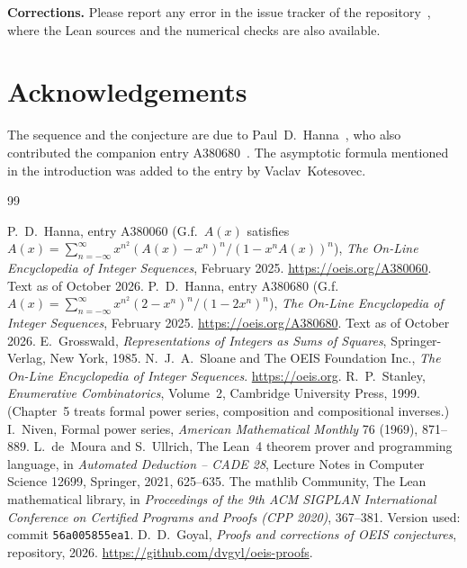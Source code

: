 \documentclass[11pt,a4paper]{article}
\theoremstyle{definition}
\theoremstyle{remark}
\newcommand{\para}[1]{\par\medskip\noindent\textbf{#1}\enspace}
\begin{document}
\para{Corrections.} Please report any error in the issue tracker of the repository~\cite{repo}, where the Lean sources and the numerical checks are also
available.

\section*{Acknowledgements}
The sequence and the conjecture are due to Paul~D.~Hanna~\cite{oeis}, who also contributed the companion entry
A380680~\cite{oeisother}. The asymptotic formula mentioned in the introduction was added to the entry by
Vaclav~Kotesovec.

\begin{thebibliography}{99}\small
\raggedright
{} P.~D.~Hanna, entry A380060 (G.f.\ $A(x)$ satisfies $A(x)=\sum_{n=-\infty}^{\infty}x^{n^2}(A(x)-x^n)^n/(1-x^nA(x))^n$), \emph{The On-Line Encyclopedia of Integer Sequences}, February 2025. \url{https://oeis.org/A380060}. Text as of October 2026.
 P.~D.~Hanna, entry A380680 (G.f.\ $A(x)=\sum_{n=-\infty}^{\infty}x^{n^2}(2-x^n)^n/(1-2x^n)^n$), \emph{The On-Line Encyclopedia of Integer Sequences}, February 2025. \url{https://oeis.org/A380680}. Text as of October 2026.
 E.~Grosswald, \emph{Representations of Integers as Sums of Squares}, Springer-Verlag, New York, 1985.
 N.~J.~A.~Sloane and The OEIS Foundation Inc., \emph{The On-Line Encyclopedia of Integer Sequences}. \url{https://oeis.org}.
 R.~P.~Stanley, \emph{Enumerative Combinatorics}, Volume~2, Cambridge University Press, 1999. (Chapter~5 treats formal power series, composition and compositional inverses.)
 I.~Niven, Formal power series, \emph{American Mathematical Monthly} 76 (1969), 871--889.
 L.~de~Moura and S.~Ullrich, The Lean~4 theorem prover and programming language, in \emph{Automated Deduction -- CADE 28}, Lecture Notes in Computer Science 12699, Springer, 2021, 625--635.
 The mathlib Community, The Lean mathematical library, in \emph{Proceedings of the 9th ACM SIGPLAN International Conference on Certified Programs and Proofs (CPP 2020)}, 367--381. Version used: commit \texttt{56a005855ea1}.
 D.~D.~Goyal, \emph{Proofs and corrections of OEIS conjectures}, repository, 2026. \url{https://github.com/dvgyl/oeis-proofs}.
\end{thebibliography}
\end{document}

